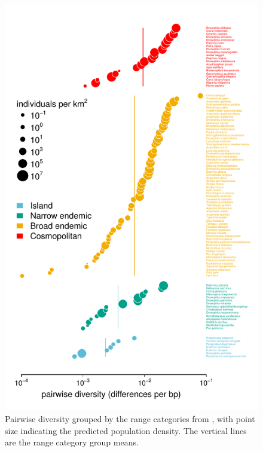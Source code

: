 \documentclass[11pt]{article}
\begin{document}
\begin{figure}[!htb]
  \centering
  \includegraphics[]{figures/diversity_leffler_ranges.pdf}

  \caption{Pairwise diversity grouped by the range categories from
  \textcite{Leffler2012-zj}, with point size indicating the predicted
   population density. The vertical lines are the range category group means.}

  \label{suppfig:div_leffler}
\end{figure}
\end{document}
